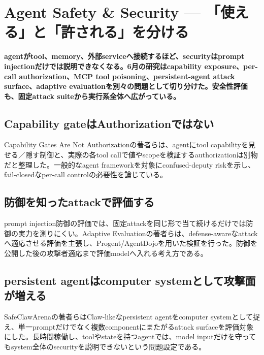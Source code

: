 \section{Agent Safety \& Security — 「使える」と「許される」を分ける}
\noindent\textbf{agentがtool、memory、外部serviceへ接続するほど、securityはprompt injectionだけでは説明できなくなる。6月の研究はcapability exposure、per-call authorization、MCP tool poisoning、persistent-agent attack surface、adaptive evaluationを別々の問題として切り分けた。安全性評価も、固定attack suiteから実行系全体へ広がっている。}\autocite{src-02da0db00c2d,src-6da0c5a88fa4,src-91b06074799d,src-c000018ba1f0,src-cd4b60edfee7}

\subsection{Capability gateはAuthorizationではない}

Capability Gates Are Not Authorizationの著者らは、agentにtool capabilityを見せる／隠す制御と、実際の各tool callで値やscopeを検証するauthorizationは別物だと整理した。一般的なagent frameworkを対象にconfused-deputy riskを示し、fail-closedなper-call controlの必要性を論じている。\autocite{src-02da0db00c2d}


\subsection{防御を知ったattackで評価する}

prompt injection防御の評価では、固定attackを同じ形で当て続けるだけでは防御の実力を測りにくい。Adaptive Evaluationの著者らは、defense-awareなattackへ適応させる評価を主張し、Progent/AgentDojoを用いた検証を行った。防御を公開した後の攻撃者適応まで評価modelへ入れる考え方である。\autocite{src-cd4b60edfee7}


\subsection{persistent agentはcomputer systemとして攻撃面が増える}

SafeClawArenaの著者らはClaw-likeなpersistent agentをcomputer systemとして捉え、単一promptだけでなく複数componentにまたがるattack surfaceを評価対象にした。長時間稼働し、toolやstateを持つagentでは、model inputだけを守ってもsystem全体のsecurityを説明できないという問題設定である。\autocite{src-6da0c5a88fa4}


